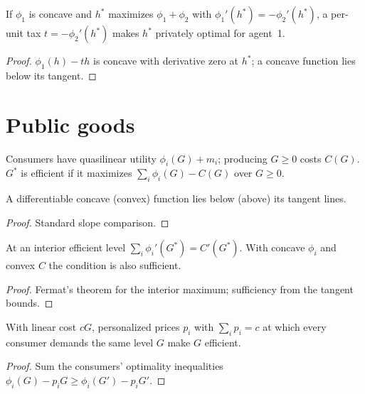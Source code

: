 \begin{theorem}
\label{thm:pigou}
\leanok
{}
If $\phi_1$ is concave and $h^*$ maximizes $\phi_1 + \phi_2$ with $\phi_1'(h^*) = -\phi_2'(h^*)$, a per-unit tax
$t = -\phi_2'(h^*)$ makes $h^*$ privately optimal for agent~1.
\end{theorem}
\begin{proof}
\leanok
$\phi_1(h) - t h$ is concave with derivative zero at $h^*$; a concave function lies below its tangent.
\end{proof}

\section{Public goods}

\begin{definition}
\label{def:public-good}
\leanok
Consumers have quasilinear utility $\phi_i(G) + m_i$; producing $G \ge 0$ costs $C(G)$. $G^*$ is efficient if it
maximizes $\sum_i \phi_i(G) - C(G)$ over $G \ge 0$.
\end{definition}

\begin{lemma}
\label{lem:tangent}
\leanok
A differentiable concave (convex) function lies below (above) its tangent lines.
\end{lemma}
\begin{proof}
\leanok
Standard slope comparison.
\end{proof}

\begin{theorem}
\label{thm:samuelson}
\leanok
{}
At an interior efficient level $\sum_i \phi_i'(G^*) = C'(G^*)$. With concave $\phi_i$ and convex $C$ the condition
is also sufficient.
\end{theorem}
\begin{proof}
\leanok
Fermat's theorem for the interior maximum; sufficiency from the tangent bounds.
\end{proof}

\begin{theorem}
\label{thm:lindahl}
\leanok
{}
With linear cost $cG$, personalized prices $p_i$ with $\sum_i p_i = c$ at which every consumer demands the same
level $G$ make $G$ efficient.
\end{theorem}
\begin{proof}
\leanok
Sum the consumers' optimality inequalities $\phi_i(G) - p_i G \ge \phi_i(G') - p_i G'$.
\end{proof}

